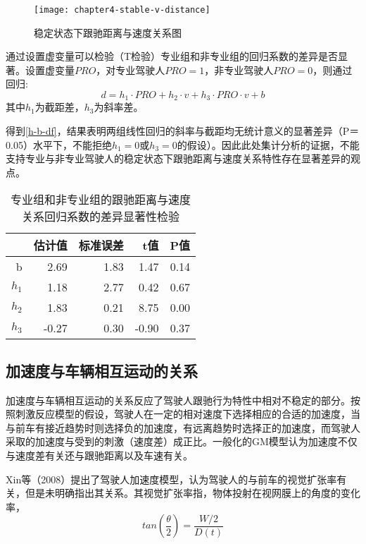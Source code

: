 \begin{figure}[htbp]
\begin{center}
\texttt{[image: chapter4-stable-v-distance]}
\end{center}
\caption{稳定状态下跟驰距离与速度关系图}
\label{stable-v-distance}
\end{figure}

通过设置虚变量可以检验（T检验）专业组和非专业组的回归系数的差异是否显著。设置虚变量$PRO$，对专业驾驶人$PRO=1$，非专业驾驶人$PRO=0$，则通过回归:
\begin{equation}
d=h_1 \cdot PRO+h_2\cdot v + h_3 \cdot PRO \cdot v +b
\end{equation}
其中$h_1$为截距差，$h_3$为斜率差。

得到\autoref{h-b-df}，结果表明两组线性回归的斜率与截距均无统计意义的显著差异（P＝0.05）水平下，不能拒绝$h_1=0$或$h_3=0$的假设）。因此此处集计分析的证据，不能支持专业与非专业驾驶人的稳定状态下跟驰距离与速度关系特性存在显著差异的观点。

\begin{table}[htbp]
\begin{center}
\caption{专业组和非专业组的跟驰距离与速度关系回归系数的差异显著性检验}
\begin{tabular}{rrrrr}
  \addlinespace
  \toprule
 & 估计值 & 标准误差 & t值 & P值 \\ 
  \midrule
b & 2.69 & 1.83 & 1.47 & 0.14 \\ 
  $h_1$ & 1.18 & 2.77 & 0.42 & 0.67 \\ 
  $h_2$ & 1.83 & 0.21 & 8.75 & 0.00 \\ 
  $h_3$ & -0.27 & 0.30 & -0.90 & 0.37 \\ 
   \bottomrule
\end{tabular}
\label{h-b-df}
\end{center}
\end{table}


\subsection{加速度与车辆相互运动的关系}
\label{ttc}
加速度与车辆相互运动的关系反应了驾驶人跟驰行为特性中相对不稳定的部分。按照刺激反应模型的假设，驾驶人在一定的相对速度下选择相应的合适的加速度，当与前车有接近趋势时则选择负的加速度，有远离趋势时选择正的加速度，而驾驶人采取的加速度与受到的刺激（速度差）成正比。一般化的GM模型认为加速度不仅与速度差有关还与跟驰距离以及车速有关。


Xin等（2008）\cite{Xin2008}提出了驾驶人加速度模型，认为驾驶人的与前车的视觉扩张率有关，但是未明确指出其关系。其视觉扩张率指，物体投射在视网膜上的角度的变化率，
\begin{equation}
tan(\frac{\theta}{2})=\frac{W/2}{D(t)}
\end{equation}

